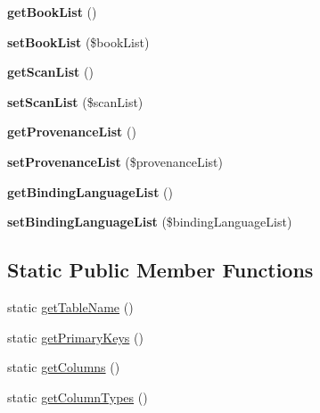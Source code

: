 \begin{DoxyCompactItemize}
\item 
\hypertarget{classBinding_aa78ebce7e2f96c5cf793a2abb7dbfbee}{
{\bfseries getBookList} ()}
\label{classBinding_aa78ebce7e2f96c5cf793a2abb7dbfbee}

\item 
\hypertarget{classBinding_a1c84609158a243b7282801a33fb4d313}{
{\bfseries setBookList} (\$bookList)}
\label{classBinding_a1c84609158a243b7282801a33fb4d313}

\item 
\hypertarget{classBinding_a91b5bbc04ceb8cfa4675a807c1ef2be6}{
{\bfseries getScanList} ()}
\label{classBinding_a91b5bbc04ceb8cfa4675a807c1ef2be6}

\item 
\hypertarget{classBinding_aa7df03c55ab408b1787871d5ffbe78cc}{
{\bfseries setScanList} (\$scanList)}
\label{classBinding_aa7df03c55ab408b1787871d5ffbe78cc}

\item 
\hypertarget{classBinding_ac793688f2e9316ac60ed807965f648e4}{
{\bfseries getProvenanceList} ()}
\label{classBinding_ac793688f2e9316ac60ed807965f648e4}

\item 
\hypertarget{classBinding_a8710fe7e69ac1f2ccda04ad5e3d20274}{
{\bfseries setProvenanceList} (\$provenanceList)}
\label{classBinding_a8710fe7e69ac1f2ccda04ad5e3d20274}

\item 
\hypertarget{classBinding_a25e67f962bf4cc9324d9b2579785032b}{
{\bfseries getBindingLanguageList} ()}
\label{classBinding_a25e67f962bf4cc9324d9b2579785032b}

\item 
\hypertarget{classBinding_a76f118ba96e8fefbf419bdac2d128e68}{
{\bfseries setBindingLanguageList} (\$bindingLanguageList)}
\label{classBinding_a76f118ba96e8fefbf419bdac2d128e68}

\end{DoxyCompactItemize}
\subsection*{Static Public Member Functions}
\begin{DoxyCompactItemize}
\item 
static \hyperlink{classBinding_aee5dd30aab182b19046ab5164da4c649}{getTableName} ()
\item 
static \hyperlink{classBinding_ac7539d5770936644b98be102ed66a4e5}{getPrimaryKeys} ()
\item 
static \hyperlink{classBinding_a4caf9958cba0f34b8b08aae313afc9ec}{getColumns} ()
\item 
static \hyperlink{classBinding_aded437d056ec24770d8bf4eebdeec36e}{getColumnTypes} ()
\end{DoxyCompactItemize}
